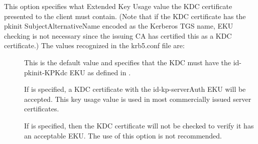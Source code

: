 \documentclass[letterpaper,10pt,english]{sphinxmanual}
\begin{document}
\begin{description}
%
\begin{sphinxVerbatim}[commandchars=\\\{\}]
  
  
  
\end{sphinxVerbatim}

\item[{\sphinxstylestrong{pkinit\_eku\_checking}}] \leavevmode
This option specifies what Extended Key Usage value the KDC
certificate presented to the client must contain.  (Note that if
the KDC certificate has the pkinit SubjectAlternativeName encoded
as the Kerberos TGS name, EKU checking is not necessary since the
issuing CA has certified this as a KDC certificate.)  The values
recognized in the krb5.conf file are:
\begin{description}
\item[{}] \leavevmode
This is the default value and specifies that the KDC must have
the id-pkinit-KPKdc EKU as defined in .

\item[{}] \leavevmode
If  is specified, a KDC certificate with the
id-kp-serverAuth EKU will be accepted.  This key usage value
is used in most commercially issued server certificates.

\item[{}] \leavevmode
If  is specified, then the KDC certificate will not be
checked to verify it has an acceptable EKU.  The use of this
option is not recommended.

\end{description}


\end{description}
\end{document}
